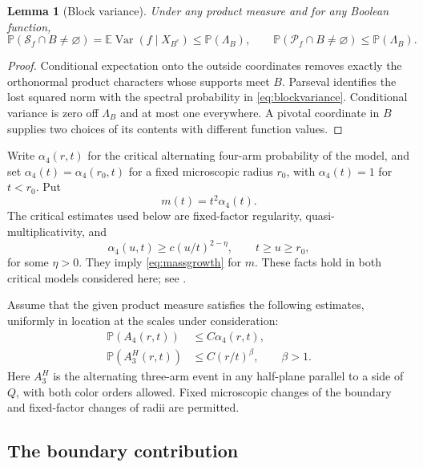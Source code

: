 \documentclass[11pt]{amsart}
\newtheorem{lemma}[theorem]{Lemma}
\theoremstyle{remark}
\newcommand{\Prob}{\mathbb P}
\newcommand{\E}{\mathbb E}
\newcommand{\cS}{\mathcal S}
\newcommand{\cP}{\mathcal P}
\DeclareMathOperator{\Var}{Var}
\begin{document}
\begin{lemma}[Block variance]\label{lem:blockvariance}
Under any product measure and for any Boolean function,
\begin{equation}\label{eq:blockvariance}
 \Prob(\cS_f\cap B\ne\varnothing)
 =\E\Var(f\mid X_{B^c})\le\Prob(\Lambda_B),
 \qquad
 \Prob(\cP_f\cap B\ne\varnothing)\le\Prob(\Lambda_B).
\end{equation}
\end{lemma}
\begin{proof}
Conditional expectation onto the outside coordinates removes exactly the orthonormal product characters whose supports meet $B$. Parseval identifies the lost squared norm with the spectral probability in \eqref{eq:blockvariance}. Conditional variance is zero off $\Lambda_B$ and at most one everywhere. A pivotal coordinate in $B$ supplies two choices of its contents with different function values.
\end{proof}

Write $\alpha_4(r,t)$ for the critical alternating four-arm probability of the model, and set $\alpha_4(t)=\alpha_4(r_0,t)$ for a fixed microscopic radius $r_0$, with $\alpha_4(t)=1$ for $t<r_0$. Put
\[
 m(t)=t^2\alpha_4(t).
\]
The critical estimates used below are fixed-factor regularity, quasi-multiplicativity, and
\begin{equation}\label{eq:armgap}
 \alpha_4(u,t)\ge c(u/t)^{2-\eta},\qquad t\ge u\ge r_0,
\end{equation}
for some $\eta>0$. They imply \eqref{eq:massgrowth} for $m$. These facts hold in both critical models considered here; see \cite[Section~2.2]{GPS}.

Assume that the given product measure satisfies the following estimates, uniformly in location at the scales under consideration:
\begin{align}
 \Prob(A_4(r,t))&\le C\alpha_4(r,t),\label{eq:armactual}\\
 \Prob(A_3^H(r,t))&\le C(r/t)^\beta,\qquad\beta>1.\label{eq:halfarm}
\end{align}
Here $A_3^H$ is the alternating three-arm event in any half-plane parallel to a side of $Q$, with both color orders allowed. Fixed microscopic changes of the boundary and fixed-factor changes of radii are permitted.

\subsection{The boundary contribution}
\end{document}
